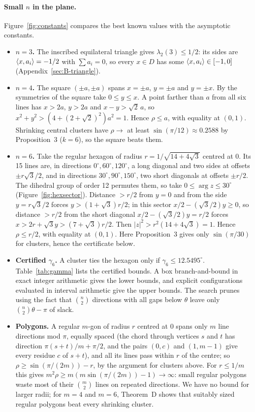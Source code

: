 \documentclass[11pt]{article}
\begin{document}
\paragraph{Small $n$ in the plane.} Figure~\ref{fig:constants} compares the best known values with
the asymptotic constants.
\begin{itemize}
\item \textbf{$n=3$.} The inscribed equilateral triangle gives $\lambda_2(3)\le1/2$: its sides are
$\langle x,a_i\rangle=-1/2$ with $\sum a_i=0$, so every $x\in D$ has some $\langle x,a_i\rangle\in[-1,0]$
(Appendix~\ref{sec:B-triangle}).
\item \textbf{$n=4$.} The square $(\pm a,\pm a)$ spans $x=\pm a$, $y=\pm a$ and $y=\pm x$. By the
symmetries of the square take $0\le y\le x$. A point farther than $a$ from all six lines has $x>2a$,
$y>2a$ and $x-y>\sqrt2\,a$, so $x^2+y^2>(4+(2+\sqrt2)^2)a^2=1$. Hence $\rho\le a$, with equality at
$(0,1)$. Shrinking central clusters have $\rho\to$ at least $\sin(\pi/12)\approx0.2588$ by
Proposition~3 ($k=6$), so the square beats them.
\item \textbf{$n=6$.} Take the regular hexagon of radius $r=1/\sqrt{14+4\sqrt3}$ centred at $0$. Its 15
lines are, in directions $0^\circ,60^\circ,120^\circ$, a long diagonal and two sides at offsets
$\pm r\sqrt3/2$, and in directions $30^\circ,90^\circ,150^\circ$, two short diagonals at offsets
$\pm r/2$. The dihedral group of order 12 permutes them, so take $0\le\arg z\le30^\circ$ (Figure~\ref{fig:hexsector}). Distance
$>r/2$ from $y=0$ and from the side $y=r\sqrt3/2$ forces $y>(1+\sqrt3)r/2$; in this sector
$x/2-(\sqrt3/2)y\ge0$, so distance $>r/2$ from the short diagonal $x/2-(\sqrt3/2)y=r/2$ forces
$x>2r+\sqrt3y>(7+\sqrt3)r/2$. Then $|z|^2>r^2(14+4\sqrt3)=1$. Hence $\rho\le r/2$, with equality at
$(0,1)$. Here Proposition~3 gives only $\sin(\pi/30)$ for clusters, hence the certificate below.
\item \textbf{Certified $\gamma_6$.} A cluster ties the hexagon only if $\gamma_6\le12.5495^\circ$.
Table~\ref{tab:gamma} lists the certified bounds. A box branch-and-bound in exact integer arithmetic
gives the lower bounds, and explicit configurations evaluated in interval arithmetic give the upper
bounds. The search prunes using the fact that $\binom n2$ directions with all gaps below $\theta$
leave only $\binom n2\theta-\pi$ of slack.
\item \textbf{Polygons.} A regular $m$-gon of radius $r$ centred at $0$ spans only $m$ line directions mod
$\pi$, equally spaced (the chord through vertices $s$ and $t$ has direction $\pi(s+t)/m+\pi/2$, and the
pairs $(0,c)$ and $(1,m-1)$ give every residue $c$ of $s+t$), and all its lines pass within $r$ of the
centre; so $\rho\ge\sin(\pi/(2m))-r$, by the argument for clusters above. For $r\le1/m$ this gives
$m^2\rho\ge m(m\sin(\pi/(2m))-1)\to\infty$: small regular polygons waste most of their $\binom m2$
lines on repeated directions. We have no bound for larger radii; for $m=4$ and $m=6$, Theorem~D shows that
suitably sized regular polygons beat every shrinking cluster.
\end{itemize}
\end{document}
